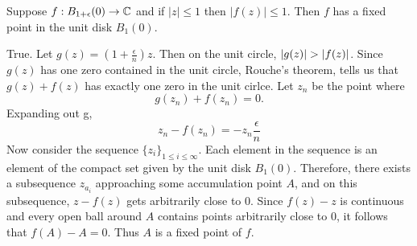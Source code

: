 \documentclass{homework}
\begin{document}
                                                                                                                          \begin{problem}
                                                                                                                            Suppose $f : B_{1+\epsilon}(0) \to \mathbb{C}$ and if $|z| \leq 1$ then
                                                                                                                              $|f(z)| \leq 1$.  Then $f$ has a fixed point in the unit disk
                                                                                                                                $B_1(0)$.
                                                                                                                                \end{problem}
                                                                                                                                \begin{solution}
                                                                                                                                True. Let $g(z) = (1 + \frac{\epsilon}{n})z$. Then on the unit circle, $\abs{g(z)}>\abs{f(z)}$. Since $g(z)$ has one zero contained in the unit circle, Rouche's theorem, tells us that $g(z) + f(z)$ has exactly one zero in the unit cirlce. Let $z_{n}$ be the point where 
                                                                                                                                \[
                                                                                                                                g(z_n) + f(z_n) = 0.
                                                                                                                                \]
                                                                                                                                Expanding out g,
                                                                                                                                \[
                                                                                                                                z_n - f(z_n) = -z_{n}\frac{\epsilon}{n}
                                                                                                                                \]
                                                                                                                                Now consider the sequence $\{z_i\}_{1\leq i \leq\infty}.$ Each element in the sequence is an element of the compact set given by the unit disk $B_1(0).$ Therefore, there exists a subsequence $z_{a_i}$ approaching some accumulation point $A$, and on this subsequence, $z-f(z)$ gets arbitrarily close to 0. Since $f(z) - z$ is continuous and every open ball around $A$ contains points arbitrarily close to $0$, it follows that $f(A) - A = 0.$ Thus $A$ is a fixed point of $f$.
                                                                                                                                \end{solution}
\end{document}
